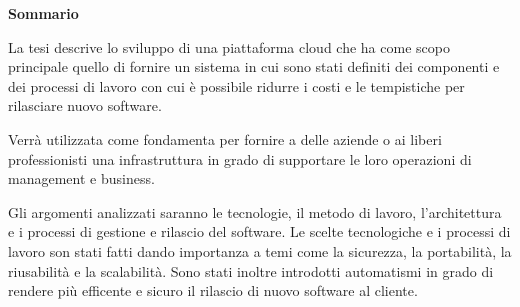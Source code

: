 \begin{center}
    \textbf{Sommario}
\end{center}
{\itshape{
    La tesi descrive lo sviluppo di una piattaforma cloud che ha come scopo principale quello di fornire un sistema in cui sono stati definiti
    dei componenti e dei processi di lavoro con cui è possibile ridurre i costi e le tempistiche per rilasciare nuovo software.

    Verrà utilizzata come fondamenta per fornire a delle aziende o ai liberi
    professionisti una infrastruttura in grado di supportare le loro operazioni di management e business.

    Gli argomenti analizzati saranno le tecnologie, il metodo di lavoro, l'architettura e i processi di gestione e rilascio del software.
    Le scelte tecnologiche e i processi di lavoro son stati fatti dando importanza a temi come la sicurezza, la portabilità, la riusabilità e la scalabilità.
    Sono stati inoltre introdotti automatismi in grado di rendere più efficente e sicuro il rilascio di nuovo software al cliente.
}}